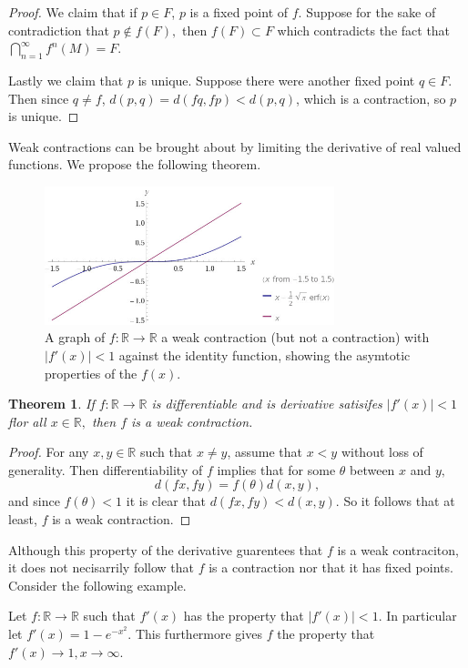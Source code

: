 \documentclass[letter]{article}
\newtheorem{theorem}{Theorem}
\newenvironment{menumerate}{%
  \edef\backupindent{\the\parindent}%
  \enumerate%
  \setlength{\parindent}{\backupindent}%
}{\endenumerate}
\begin{document}
\begin{menumerate}
\begin{proof}
	 We claim that if $p \in F$, $p$ is a fixed point of $f.$ Suppose for the sake of contradiction that $p \notin f(F),$
	 then $f(F) \subset F$ which contradicts the fact that $\bigcap_{n=1}^\infty f^n(M) = F.$

	 Lastly we claim that $p$ is unique. Suppose there were another fixed point $q \in F.$ Then since $q\neq f$, $d(p,q) = d(fq,fp) < d(p,q)$,
	 which is a contraction, so $p$ is unique.
\end{proof}




\item Weak contractions can be brought about by limiting the derivative of real valued functions. We propose the following theorem.
\begin{figure}
  \centering
  \includegraphics[width=0.75\textwidth]{28contract}
  \caption{A graph of $f:\mathbb{R}\to\mathbb{R}$ a weak contraction (but not a contraction) with $|f'(x)| < 1$ against the identity function, showing the asymtotic
  properties of the $f(x).$}
\end{figure}
\begin{theorem}
	If $f:\mathbb{R} \to \mathbb{R}$ is differentiable and is derivative satisifes $|f'(x)| < 1$ flor all $x \in \mathbb{R},$ then
	$f$ is a weak contraction.
\end{theorem}
\begin{proof}
	For any $x,y \in \mathbb{R}$ such that $x\neq y$, assume that $x < y$ without loss of generality. Then differentiability of $f$ implies that 
	for some $\theta$ between $x$ and $y,$ $$d(fx,fy) = f(\theta)d(x,y),$$ and since $f(\theta) < 1$ it is clear that $d(fx,fy) < d(x,y).$ So it follows
	that at least, $f$ is a weak contraction.
\end{proof}
Although this property of the derivative guarentees that $f$ is a weak contraciton, it does not necisarrily follow that
 $f$ is a contraction nor that it has fixed points. Consider the following example.

Let $f:\mathbb{R} \to \mathbb{R}$ such that $f'(x)$ has the property that $|f'(x)| < 1.$ In particular let $f'(x) = 1 - e^{-x^2}.$ This furthermore
gives $f$ the property that $f'(x) \to 1, x \to \infty.$ 


\end{menumerate}
\end{document}
